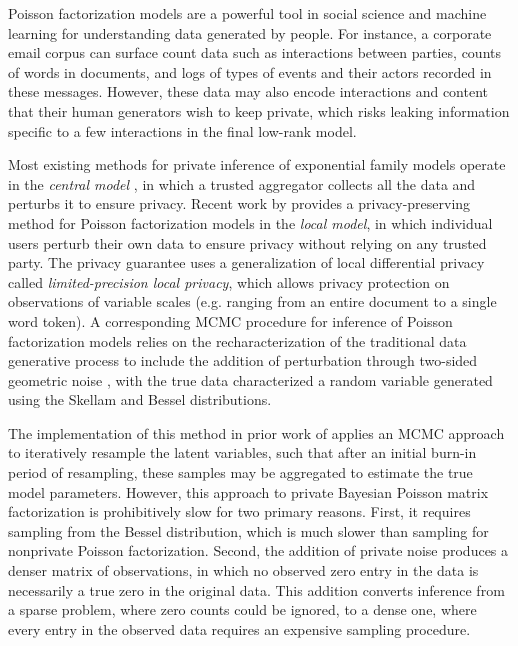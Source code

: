 \documentclass[letterpaper]{article}
\begin{document}
  Poisson factorization models are a powerful tool in social science and machine
  learning for understanding data generated by people. For instance, a corporate
  email corpus can surface count data such as interactions between parties,
  counts of words in documents, and logs of types of events and their actors
  recorded in these messages. However, these data may also encode interactions
  and content that their human generators wish to keep private, which risks
  leaking information specific to a few interactions in the final low-rank
  model.
  
  Most existing methods for private inference of exponential family models
  operate in the \emph{central model}
  \citep{park2016private,bernstein2018differentially}, in which a trusted
  aggregator collects all the data and perturbs it to ensure privacy. Recent
  work by \cite{schein2018locally} provides a privacy-preserving method for
  Poisson factorization models in the \emph{local model}, in which individual
  users perturb their own data to ensure privacy without relying on any trusted
  party. The privacy guarantee uses a generalization of local differential
  privacy \citep{warner1965randomized} called \textit{limited-precision local
  privacy}, which allows privacy protection on observations of variable scales
  (e.g. ranging from an entire document to a single word token). A corresponding
  MCMC procedure for inference of Poisson factorization models relies on the
  recharacterization of the traditional data generative process to include the
  addition of perturbation through two-sided geometric noise
  \citep{ghosh2012universally}, with the true data characterized a random
  variable generated using the Skellam and Bessel distributions.
  
  The implementation of this method in prior work of \citep{schein2018locally}
  applies an MCMC approach to iteratively resample the latent variables, such
  that after an initial burn-in period of resampling, these samples may be
  aggregated to estimate the true model parameters. However, this approach to
  private Bayesian Poisson matrix factorization is prohibitively slow for two
  primary reasons. First, it requires sampling from the Bessel distribution,
  which is much slower than sampling for nonprivate Poisson factorization.
  Second, the addition of private noise produces a denser matrix of
  observations, in which no observed zero entry in the data is necessarily a
  true zero in the original data. This addition converts inference from a sparse
  problem, where zero counts could be ignored, to a dense one, where every entry
  in the observed data requires an expensive sampling procedure.
  
\end{document}

